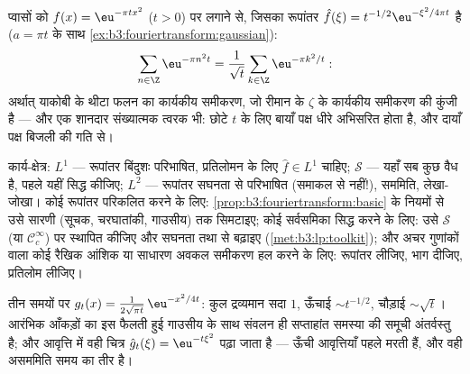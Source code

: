 \begin{example}[थीटा सर्वसमिका]
\label{ex:b3:fouriertransform:theta}
प्वासों को $f(x) = \eu^{-\pi tx^2}$ ($t > 0$) पर लगाने से, जिसका रूपांतर $\hat f(\xi) = t^{-1/2}\eu^{-\xi^2/4\pi t}$ है
($a = \pi t$ के साथ \cref{ex:b3:fouriertransform:gaussian}):
\[
\sum_{n\in\Z}\eu^{-\pi n^2t}
= \frac1{\sqrt t}\sum_{k\in\Z}\eu^{-\pi k^2/t} :
\]
अर्थात् याकोबी के थीटा फलन का कार्यकीय समीकरण, जो रीमान के $\zeta$
के कार्यकीय समीकरण की कुंजी है --- और एक शानदार संख्यात्मक त्वरक
भी: छोटे $t$ के लिए बायाँ पक्ष धीरे अभिसरित होता है, और दायाँ
पक्ष बिजली की गति से।
\end{example}

\begin{method}\label{met:b3:fouriertransform:method}
कार्य-क्षेत्र: $L^1$ --- रूपांतर बिंदुशः परिभाषित, प्रतिलोमन के
लिए $\hat f \in L^1$ चाहिए; $\mathcal S$ --- यहाँ सब कुछ वैध है, पहले यहीं सिद्ध
कीजिए; $L^2$ --- रूपांतर सघनता से परिभाषित (समाकल से नहीं!), 
सममिति,  लेखा-जोखा। कोई रूपांतर परिकलित करने के लिए:
\cref{prop:b3:fouriertransform:basic} के नियमों से उसे सारणी (सूचक, चरघातांकी, गाउसीय) तक सिमटाइए;
कोई सर्वसमिका सिद्ध करने के लिए: उसे $\mathcal S$ (या $\mathcal C_c^\infty$) पर स्थापित
कीजिए और सघनता तथा  से बढ़ाइए (\cref{met:b3:lp:toolkit}); और अचर गुणांकों वाला
कोई रैखिक आंशिक या साधारण अवकल समीकरण हल करने के लिए: रूपांतर
लीजिए, भाग दीजिए, प्रतिलोम लीजिए।
\end{method}

\begin{omfigure}

{\small तीन समयों पर  $g_t(x) =
\frac1{2\sqrt{\pi t}}\,\eu^{-x^2/4t}$: कुल द्रव्यमान सदा $1$,
ऊँचाई $\sim t^{-1/2}$, चौड़ाई $\sim
\sqrt t$। आरंभिक आँकड़ों का इस फैलती हुई गाउसीय
के साथ संवलन ही सप्ताहांत समस्या की समूची अंतर्वस्तु है; और
आवृत्ति में वही चित्र $\hat g_t(\xi) = \eu^{-t\xi^2}$ पढ़ा जाता है --- ऊँची आवृत्तियाँ पहले
मरती हैं, और वही असममिति समय का तीर है।}
\end{omfigure}

